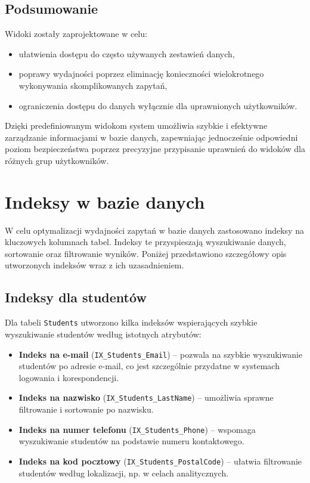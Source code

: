 \documentclass[12pt]{article}
\begin{document}
\subsection{Podsumowanie}

\noindent Widoki zostały zaprojektowane w celu:
\begin{itemize}
    \item ułatwienia dostępu do często używanych zestawień danych,
    \item poprawy wydajności poprzez eliminację konieczności wielokrotnego wykonywania skomplikowanych zapytań,
    \item ograniczenia dostępu do danych wyłącznie dla uprawnionych użytkowników.
\end{itemize}

\noindent Dzięki predefiniowanym widokom system umożliwia szybkie i efektywne zarządzanie informacjami w bazie danych, zapewniając jednocześnie odpowiedni poziom bezpieczeństwa poprzez precyzyjne przypisanie uprawnień do widoków dla różnych grup użytkowników.

\newpage
\section{Indeksy w bazie danych}
\label{sec:indeksy}

\noindent W celu optymalizacji wydajności zapytań w bazie danych zastosowano indeksy na kluczowych kolumnach tabel. Indeksy te przyspieszają wyszukiwanie danych, sortowanie oraz filtrowanie wyników. Poniżej przedstawiono szczegółowy opis utworzonych indeksów wraz z ich uzasadnieniem.

\subsection{Indeksy dla studentów}

\noindent Dla tabeli \texttt{Students} utworzono kilka indeksów wspierających szybkie wyszukiwanie studentów według istotnych atrybutów:

\begin{itemize}
    \item \textbf{Indeks na e-mail} (\texttt{IX\_Students\_Email}) -- pozwala na szybkie wyszukiwanie studentów po adresie e-mail, co jest szczególnie przydatne w systemach logowania i korespondencji.
    \item \textbf{Indeks na nazwisko} (\texttt{IX\_Students\_LastName}) -- umożliwia sprawne filtrowanie i sortowanie po nazwisku.
    \item \textbf{Indeks na numer telefonu} (\texttt{IX\_Students\_Phone}) -- wspomaga wyszukiwanie studentów na podstawie numeru kontaktowego.
    \item \textbf{Indeks na kod pocztowy} (\texttt{IX\_Students\_PostalCode}) -- ułatwia filtrowanie studentów według lokalizacji, np. w celach analitycznych.
\end{itemize}
\end{document}
